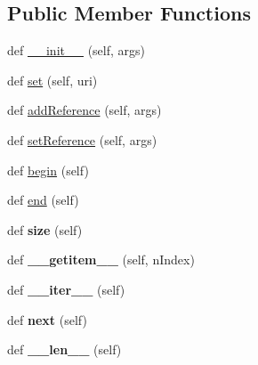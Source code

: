 \subsection*{Public Member Functions}
\begin{DoxyCompactItemize}
\item 
def \hyperlink{classsbol_1_1libsbol_1_1_referenced_object_a3c546c88d9b5ffd0c32d3dd85ed04e45}{\+\_\+\+\_\+init\+\_\+\+\_\+} (self, args)
\item 
def \hyperlink{classsbol_1_1libsbol_1_1_referenced_object_a10a75413cbd6ea3f0e71bb3fae7dcacf}{set} (self, uri)
\item 
def \hyperlink{classsbol_1_1libsbol_1_1_referenced_object_a2614a7188d104423a5d06acad2b94876}{add\+Reference} (self, args)
\item 
def \hyperlink{classsbol_1_1libsbol_1_1_referenced_object_aa178100da1257f783aee181906807135}{set\+Reference} (self, args)
\item 
def \hyperlink{classsbol_1_1libsbol_1_1_referenced_object_a880ec7624aa10ac445f2b17dc56f754f}{begin} (self)
\item 
def \hyperlink{classsbol_1_1libsbol_1_1_referenced_object_a28ae3ca9d96f6f037fac123a9e388294}{end} (self)
\item 
def {\bfseries size} (self)\hypertarget{classsbol_1_1libsbol_1_1_referenced_object_ac209d876022591606b808a1b448d0a75}{}\label{classsbol_1_1libsbol_1_1_referenced_object_ac209d876022591606b808a1b448d0a75}

\item 
def {\bfseries \+\_\+\+\_\+getitem\+\_\+\+\_\+} (self, n\+Index)\hypertarget{classsbol_1_1libsbol_1_1_referenced_object_a6cc74639a9ce325a148e4c5989e5cd02}{}\label{classsbol_1_1libsbol_1_1_referenced_object_a6cc74639a9ce325a148e4c5989e5cd02}

\item 
def {\bfseries \+\_\+\+\_\+iter\+\_\+\+\_\+} (self)\hypertarget{classsbol_1_1libsbol_1_1_referenced_object_aa7351b7f78664f42b84c53ac78ea19a9}{}\label{classsbol_1_1libsbol_1_1_referenced_object_aa7351b7f78664f42b84c53ac78ea19a9}

\item 
def {\bfseries next} (self)\hypertarget{classsbol_1_1libsbol_1_1_referenced_object_a119972d311062da7a8d0d2c40ec7dab8}{}\label{classsbol_1_1libsbol_1_1_referenced_object_a119972d311062da7a8d0d2c40ec7dab8}

\item 
def {\bfseries \+\_\+\+\_\+len\+\_\+\+\_\+} (self)\hypertarget{classsbol_1_1libsbol_1_1_referenced_object_a0a4a69afc4b8c619515eb0c1b87cd8ae}{}\label{classsbol_1_1libsbol_1_1_referenced_object_a0a4a69afc4b8c619515eb0c1b87cd8ae}

\end{DoxyCompactItemize}
